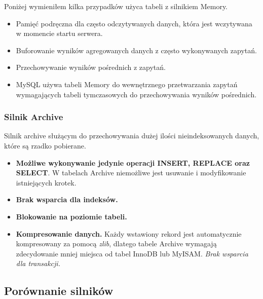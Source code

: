  Poniżej wymieniłem kilka przypadków użyca tabeli z silnikiem Memory. 
\begin{itemize}
	\item Pamięć podręczna dla często odczytywanych danych, która jest wczytywana w momencie startu serwera.
	\item Buforowanie wyników agregowanych danych z często wykonywanych zapytań.
	\item Przechowywanie wyników pośrednich z zapytań.
	\item MySQL używa tabeli Memory do wewnętrznego przetwarzania zapytań wymagających tabeli tymczasowych do przechowywania wyników pośrednich.
\end{itemize}

\subsubsection{Silnik Archive}
Silnik archive służącym do przechowywania dużej ilości nieindeksowanych danych, które są rzadko pobierane. 

\begin{itemize}
	\item \textbf{Możliwe wykonywanie jedynie operacji INSERT, REPLACE oraz SELECT}. W tabelach Archive niemożliwe jest usuwanie i modyfikowanie istniejących krotek.
	\item \textbf{Brak wsparcia dla indeksów.}
	\item \textbf{Blokowanie na poziomie tabeli.}
	\item \textbf{Kompresowanie danych.} Każdy wstawiony rekord jest automatycznie kompresowany za pomocą \textit{zlib}, dlatego tabele Archive wymagają zdecydowanie mniej miejsca od tabel InnoDB lub MyISAM.
	\textit{Brak wsparcia dla transakcji.}
\end{itemize}


\subsection{Porównanie silników}



